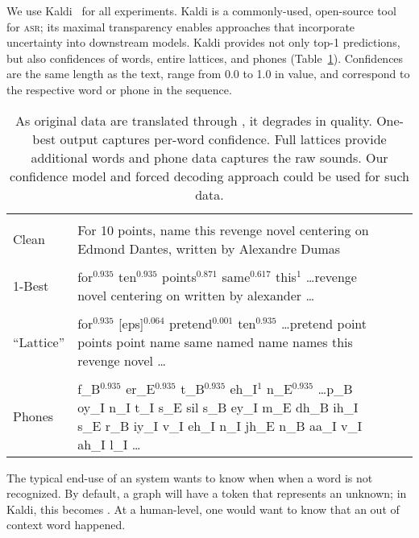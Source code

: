 We use Kaldi~\cite{Povey11thekaldi} for all experiments.  Kaldi is a commonly-used, open-source tool for
 \textsc{asr}; its maximal transparency enables approaches that incorporate uncertainty into
downstream models.  Kaldi provides not only top-1
predictions, but also confidences of words, entire lattices, and phones
(Table~\ref{tab:data}).  Confidences are the same length as the
text, range from 0.0 to 1.0 in value, and correspond to the respective
word or phone in the sequence. 

\begin{table}[t!]
	\caption{As original data are translated through , it
		degrades in quality.  One-best output captures per-word
		confidence.  Full lattices provide additional words and phone data captures the raw  sounds.  Our confidence model and forced decoding approach could be used for such data.}
	\small
	\begin{tabularx}{.48\textwidth}{lXXr}
		\hline
		\\[-1em]
				Clean  & For 10 points, name this revenge novel centering on Edmond Dantes, written by Alexandre Dumas  \\ 
		\hline 
		\\[-1em]
		1-Best& for$^{0.935}$ ten$^{0.935}$ points$^{0.871}$ same$^{0.617}$ this$^{1}$ \ldots revenge novel centering on \unk{} written by alexander \unk{} \dots \\
		\hline 
		\\[-1em]
		``Lattice''& for$^{0.935}$ [eps]$^{0.064}$ pretend$^{0.001}$ ten$^{0.935}$  \dots \mbox{pretend}   point points  point   name same named name names this revenge novel \ldots \\
		\hline  
		\\[-1em]
		Phones  & f\_B$^{0.935}$ er\_E$^{0.935}$  t\_B$^{0.935}$  eh\_I$^{1}$  n\_E$^{0.935}$ \ldots p\_B   oy\_I n\_I t\_I s\_E sil s\_B ey\_I m\_E dh\_B ih\_I s\_E r\_B iy\_I v\_I eh\_I n\_I jh\_E n\_B aa\_I v\_I ah\_I l\_I \ldots \\
		
		\hline
	\end{tabularx}

	\label{tab:data}

\end{table}

	
The typical end-use of an \asr{} system wants to know when when a word is not recognized.  
By default, a graph will have a token that represents an unknown; in Kaldi, this becomes \unk{}.
At a human-level, one would want to know that an out of context word happened.

